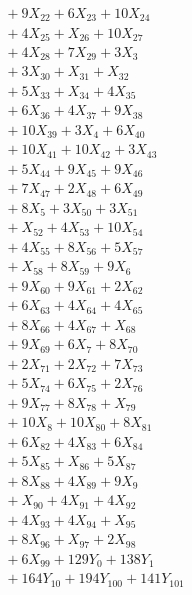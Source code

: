 \documentclass[a4paper,10pt]{article}
\begin{document}
{\begin{align}
&\quad  + 9X_{22} + 6X_{23} + 10X_{24} \\[0.5ex]
&\quad  + 4X_{25} + X_{26} + 10X_{27} \\[0.5ex]
&\quad  + 4X_{28} + 7X_{29} + 3X_{3} \\[0.5ex]
&\quad  + 3X_{30} + X_{31} + X_{32} \\[0.5ex]
&\quad  + 5X_{33} + X_{34} + 4X_{35} \\[0.5ex]
&\quad  + 6X_{36} + 4X_{37} + 9X_{38} \\[0.5ex]
&\quad  + 10X_{39} + 3X_{4} + 6X_{40} \\[0.5ex]
&\quad  + 10X_{41} + 10X_{42} + 3X_{43} \\[0.5ex]
&\quad  + 5X_{44} + 9X_{45} + 9X_{46} \\[0.5ex]
&\quad  + 7X_{47} + 2X_{48} + 6X_{49} \\[0.5ex]
&\quad  + 8X_{5} + 3X_{50} + 3X_{51} \\[0.5ex]
&\quad  + X_{52} + 4X_{53} + 10X_{54} \\[0.5ex]
&\quad  + 4X_{55} + 8X_{56} + 5X_{57} \\[0.5ex]
&\quad  + X_{58} + 8X_{59} + 9X_{6} \\[0.5ex]
&\quad  + 9X_{60} + 9X_{61} + 2X_{62} \\[0.5ex]
&\quad  + 6X_{63} + 4X_{64} + 4X_{65} \\[0.5ex]
&\quad  + 8X_{66} + 4X_{67} + X_{68} \\[0.5ex]
&\quad  + 9X_{69} + 6X_{7} + 8X_{70} \\[0.5ex]
&\quad  + 2X_{71} + 2X_{72} + 7X_{73} \\[0.5ex]
&\quad  + 5X_{74} + 6X_{75} + 2X_{76} \\[0.5ex]
&\quad  + 9X_{77} + 8X_{78} + X_{79} \\[0.5ex]
&\quad  + 10X_{8} + 10X_{80} + 8X_{81} \\[0.5ex]
&\quad  + 6X_{82} + 4X_{83} + 6X_{84} \\[0.5ex]
&\quad  + 5X_{85} + X_{86} + 5X_{87} \\[0.5ex]
&\quad  + 8X_{88} + 4X_{89} + 9X_{9} \\[0.5ex]
&\quad  + X_{90} + 4X_{91} + 4X_{92} \\[0.5ex]
&\quad  + 4X_{93} + 4X_{94} + X_{95} \\[0.5ex]
&\quad  + 8X_{96} + X_{97} + 2X_{98} \\[0.5ex]
&\quad  + 6X_{99} + 129Y_{0} + 138Y_{1} \\[0.5ex]
&\quad  + 164Y_{10} + 194Y_{100} + 141Y_{101} \\[0.5ex]

\end{align}}
\end{document}

